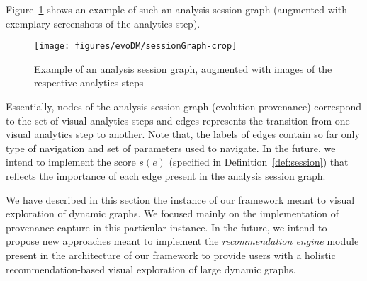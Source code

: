 
Figure~\ref{fig:expo-session} shows an example of such an analysis session graph (augmented with exemplary screenshots of the analytics step).

\begin{figure}[b]
	\center
	\texttt{[image: figures/evoDM/sessionGraph-crop]}
			\caption{Example of an analysis session graph, augmented with images of the respective analytics steps~\cite{Bruder2019}}
			\label{fig:expo-session}
\end{figure}

Essentially, {\color{Fuchsia}nodes of the analysis session graph (evolution provenance)} correspond to the set of visual analytics steps and edges represents the transition from one visual analytics step to another. %
Note that, the labels of edges contain so far only type of navigation and set of parameters used to navigate. In the future, we intend to implement the score $s(e)$ (specified in Definition~\ref{def:session}) that reflects the importance of each edge present in the analysis session graph.


{\color{Fuchsia}We have described in this section the instance of our framework \framework{} meant to visual exploration of dynamic graphs. We focused mainly on the implementation of provenance capture in this particular instance. In the future, we intend to propose new approaches meant to implement the \emph{recommendation engine} module present in the architecture of our framework to provide users with a holistic recommendation-based visual exploration of large dynamic graphs. }
